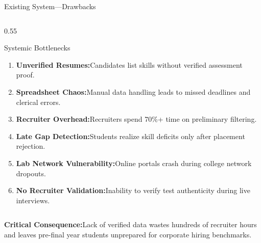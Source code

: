 \documentclass[aspectratio=169,10pt,xcolor={table,dvipsnames}]{beamer}
\begin{document}
\begin{frame}[t]{Existing System\enspace---\enspace Drawbacks}
\begin{columns}[T]
    \begin{column}{0.55\textwidth}
      \begin{plaincard}{Systemic Bottlenecks}
        \fontsize{6.8}{8.2}\selectfont
        \begin{enumerate}\setlength{\itemsep}{2.2pt}
          \item \textbf{Unverified Resumes:}\;Candidates list skills without verified assessment proof.
          \item \textbf{Spreadsheet Chaos:}\;Manual data handling leads to missed deadlines and clerical errors.
          \item \textbf{Recruiter Overhead:}\;Recruiters spend 70\%+ time on preliminary filtering.
          \item \textbf{Late Gap Detection:}\;Students realize skill deficits only after placement rejection.
          \item \textbf{Lab Network Vulnerability:}\;Online portals crash during college network dropouts.
          \item \textbf{No Recruiter Validation:}\;Inability to verify test authenticity during live interviews.
        \end{enumerate}
      \end{plaincard}
    \end{column}
  \end{columns}

  \vspace{0.12cm}
  \begin{tcolorbox}[
    enhanced,colback=LightSilver,colframe=BorderColor,
    arc=2pt,boxrule=0.6pt,
    left=6pt,right=6pt,top=2.5pt,bottom=2.5pt]
    \centering\fontsize{6.5}{7.8}\selectfont
    \textbf{\color{Navy}Critical Consequence:}\;Lack of verified data wastes hundreds of recruiter hours and leaves pre-final year students unprepared for corporate hiring benchmarks.
  \end{tcolorbox}
\end{frame}
\end{document}
